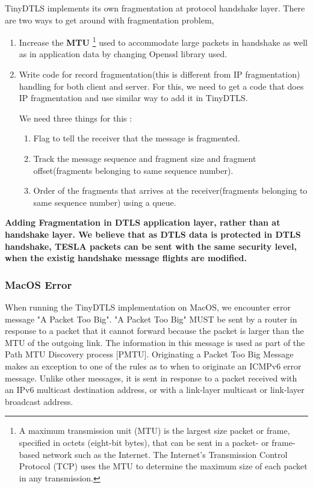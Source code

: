 TinyDTLS implements its own fragmentation at protocol handshake layer. There are two ways to get around with fragmentation problem, 
\begin{enumerate}
    \item Increase the \textbf{MTU} \footnote{A maximum transmission unit (MTU) is the largest size packet or frame, specified in octets (eight-bit bytes), that can be sent in a packet- or frame-based network such as the Internet. The Internet's Transmission Control Protocol (TCP) uses the MTU to determine the maximum size of each packet in any transmission.} used to accommodate large packets in handshake as well as in application data by changing Openssl library used. 
    
    \item Write code for record fragmentation(this is different from IP fragmentation) handling for both client and server. For this, we need to get a code that does IP fragmentation and use similar way to add it in TinyDTLS.
    
    We need three things for this : 
    \begin{enumerate}
        \item Flag to tell the receiver that the message is fragmented.
    
        \item Track the message sequence and fragment size and fragment offset(fragments belonging to same sequence number).
        
        \item Order of the fragments that arrives at the receiver(fragments belonging to same sequence number) using a queue.
    \end{enumerate}
    
\end{enumerate}

\textbf{Adding Fragmentation in DTLS application layer, rather than at handshake layer. We believe that as DTLS data is protected in DTLS handshake, TESLA packets can be sent with the same security level, when the existig handshake message flights are modified.}


\subsubsection{MacOS Error} 
When running the TinyDTLS implementation on MacOS, we encounter error message "A Packet Too Big". "A Packet Too Big" MUST be sent by a router in response to a packet that it cannot forward because the packet is larger than the MTU of the outgoing link.  The information in this message is used as part of the Path MTU Discovery process [PMTU]. Originating a Packet Too Big Message makes an exception to one of the rules as to when to originate an ICMPv6 error message.  Unlike other messages, it is sent in response to a packet received with an IPv6 multicast destination address, or with a link-layer multicast or link-layer broadcast address.



